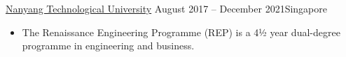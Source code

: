 \documentclass[10.5pt,a4paper,ragged2e,withhyper]{altacv}
\begin{document}
\begin{paracol}{2}




\medskip


  {\href{https://www.ntu.edu.sg/education/undergraduate-programme/renaissance-engineering-programme-(rep)}{Nanyang Technological University}}
  {August 2017 -- December 2021}{Singapore}
\begin{itemize}
  \item The Renaissance Engineering Programme (REP) is a 4½ year dual-degree programme in engineering and business.
\end{itemize}







\end{paracol}
\end{document}
